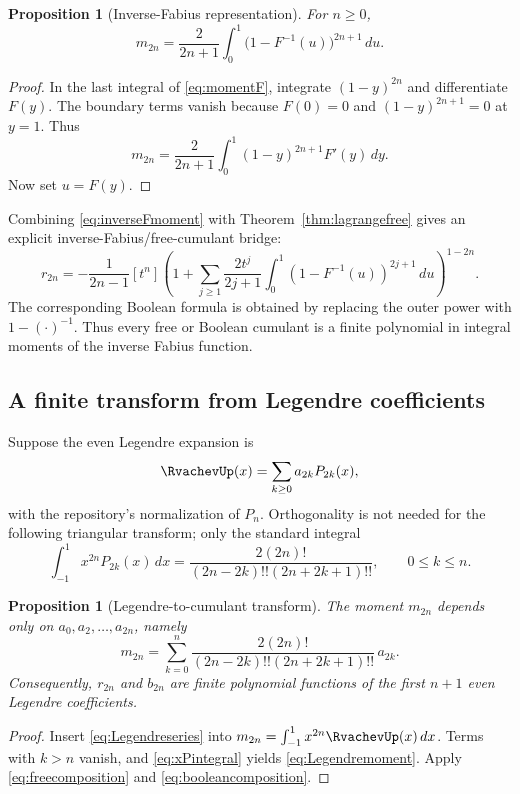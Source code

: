 \documentclass[11pt,oneside]{article}
\newtheorem{proposition}[theorem]{Proposition}
\theoremstyle{definition}
\theoremstyle{remark}
\begin{document}
\begin{proposition}[Inverse-Fabius representation]\label{prop:inverseFmoment}
For \(n\ge0\),
\begin{equation}\label{eq:inverseFmoment}
m_{2n}=\frac{2}{2n+1}\int_0^1\bigl(1-F^{-1}(u)\bigr)^{2n+1}\,du.
\end{equation}
\end{proposition}
\begin{proof}
In the last integral of \eqref{eq:momentF}, integrate \((1-y)^{2n}\) and differentiate \(F(y)\). The boundary terms vanish because \(F(0)=0\) and \((1-y)^{2n+1}=0\) at \(y=1\). Thus
\[
m_{2n}=\frac{2}{2n+1}\int_0^1(1-y)^{2n+1}F'(y)\,dy.
\]
Now set \(u=F(y)\).
\end{proof}

Combining \eqref{eq:inverseFmoment} with Theorem~\ref{thm:lagrangefree} gives an explicit inverse-Fabius/free-cumulant bridge:
\begin{equation}\label{eq:inverseFfree}
r_{2n}=-\frac1{2n-1}[t^n]
\left(
1+\sum_{j\ge1}\frac{2t^j}{2j+1}
\int_0^1(1-F^{-1}(u))^{2j+1}\,du
\right)^{1-2n}.
\end{equation}
The corresponding Boolean formula is obtained by replacing the outer power with \(1-(\cdot)^{-1}\). Thus every free or Boolean cumulant is a finite polynomial in integral moments of the inverse Fabius function.

\subsection{A finite transform from Legendre coefficients}
Suppose the even Legendre expansion is
\begin{equation}\label{eq:Legendreseries}
\RvachevUp(x)=\sum_{k\ge0}a_{2k}P_{2k}(x),
\end{equation}
with the repository's normalization of \(P_n\). Orthogonality is not needed for the following triangular transform; only the standard integral
\begin{equation}\label{eq:xPintegral}
\int_{-1}^1x^{2n}P_{2k}(x)\,dx
=\frac{2(2n)!}{(2n-2k)!!(2n+2k+1)!!},
\qquad 0\le k\le n.
\end{equation}

\begin{proposition}[Legendre-to-cumulant transform]\label{prop:Legendretransform}
The moment \(m_{2n}\) depends only on \(a_0,a_2,\ldots,a_{2n}\), namely
\begin{equation}\label{eq:Legendremoment}
m_{2n}=\sum_{k=0}^n
\frac{2(2n)!}{(2n-2k)!!(2n+2k+1)!!}\,a_{2k}.
\end{equation}
Consequently, \(r_{2n}\) and \(b_{2n}\) are finite polynomial functions of the first \(n+1\) even Legendre coefficients.
\end{proposition}
\begin{proof}
Insert \eqref{eq:Legendreseries} into \(m_{2n}=\int_{-1}^1x^{2n}\RvachevUp(x)\,dx\). Terms with \(k>n\) vanish, and \eqref{eq:xPintegral} yields \eqref{eq:Legendremoment}. Apply \eqref{eq:freecomposition} and \eqref{eq:booleancomposition}.
\end{proof}
\end{document}
